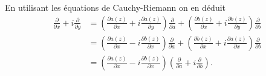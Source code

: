 {{En utilisant les \'equations de Cauchy-Riemann on en d\'eduit
$$\begin{aligned}
\frac{\partial }{\partial x}+i\frac{\partial }{\partial y}&= \left(\frac{\partial a(z)}{\partial x}+i \frac{\partial a(z)}{\partial y} \right)\frac{\partial }{\partial a}
+ \left(\frac{\partial b(z)}{\partial x}+i \frac{\partial b(z)}{\partial y} \right)\frac{\partial }{\partial b}\\
&= \left(\frac{\partial a(z)}{\partial x}-i \frac{\partial b(z)}{\partial x} \right)\frac{\partial }{\partial a}
+ \left(\frac{\partial b(z)}{\partial x}+i \frac{\partial a(z)}{\partial x} \right)\frac{\partial }{\partial b}\\
&=\left(\frac{\partial a(z)}{\partial x}-i \frac{\partial b(z)}{\partial x} \right)\left(\frac{\partial }{\partial a}+i\frac{\partial }{\partial b}\right).
\end{aligned}$$}
}